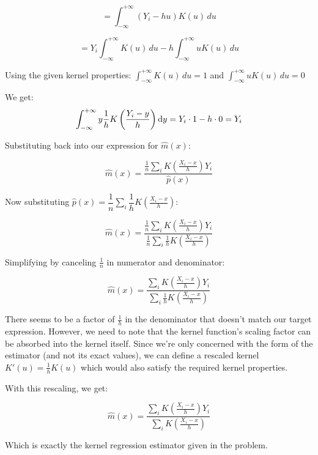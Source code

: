 $$= \int_{-\infty}^{+\infty} (Y_i - hu) K(u) \, du$$

$$= Y_i \int_{-\infty}^{+\infty} K(u) \, du - h \int_{-\infty}^{+\infty} u K(u) \, du$$

Using the given kernel properties:
$\int_{-\infty}^{+\infty} K(u) \, du = 1$ and $\int_{-\infty}^{+\infty} u K(u) \, du = 0$

We get:
$$\int_{-\infty}^{+\infty} y \frac{1}{h} K\left(\frac{Y_{i}-y}{h}\right) \mathrm{d}y = Y_i \cdot 1 - h \cdot 0 = Y_i$$

Substituting back into our expression for $\hat{m}(x)$:

$$\hat{m}(x)=\dfrac{\frac{1}{n} \sum_{i} K\left(\frac{X_{i}-x}{h}\right) Y_i}{\hat{p}(x)}$$

Now substituting $\hat{p}(x) = \dfrac{1}{n} \sum_{i} \dfrac{1}{h} K\left(\frac{X_{i}-x}{h}\right)$:

$$\hat{m}(x)=\dfrac{\frac{1}{n} \sum_{i} K\left(\frac{X_{i}-x}{h}\right) Y_i}{\frac{1}{n} \sum_{i} \frac{1}{h} K\left(\frac{X_{i}-x}{h}\right)}$$

Simplifying by canceling $\frac{1}{n}$ in numerator and denominator:

$$\hat{m}(x)=\dfrac{\sum_{i} K\left(\frac{X_{i}-x}{h}\right) Y_i}{\sum_{i} \frac{1}{h} K\left(\frac{X_{i}-x}{h}\right)}$$

There seems to be a factor of $\frac{1}{h}$ in the denominator that doesn't match our target expression. However, we need to note that the kernel function's scaling factor can be absorbed into the kernel itself. Since we're only concerned with the form of the estimator (and not its exact values), we can define a rescaled kernel $K'(u) = \frac{1}{h}K(u)$ which would also satisfy the required kernel properties. 

With this rescaling, we get:

$$\hat{m}(x) = \dfrac{\sum_{i} K\left(\frac{X_{i}-x}{h}\right) Y_i}{\sum_{i} K\left(\frac{X_{i}-x}{h}\right)}$$

Which is exactly the kernel regression estimator given in the problem.

\newpage